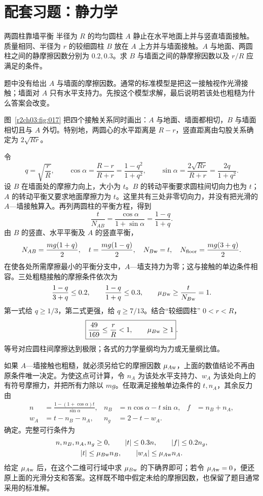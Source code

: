 \section{配套习题：静力学}

\begin{practicebox}{两圆柱靠墙平衡}
半径为 $R$ 的均匀圆柱 $A$ 静止在水平地面上并与竖直墙面接触。质量相同、半径为 $r$ 的较细圆柱 $B$ 放在 $A$ 上方并与墙面接触。$A$ 与地面、两圆柱之间的静摩擦因数分别为 $0.2,0.3$。求 $B$ 与墙面之间的静摩擦因数以及 $r/R$ 应满足的条件。
\label{r2ch03:pr:001}
\begin{solution}
题中没有给出 $A$ 与墙面的摩擦因数。通常的标准模型是把这一接触视作光滑接触；墙面对 $A$ 只有水平支持力。先按这个模型求解，最后说明若该处也粗糙为什么答案会改变。

图~\ref{r2ch03:fig:017} 把四个接触关系同时画出：$A$ 与地面、墙面都相切，$B$ 与墙面相切且与 $A$ 外切。特别地，两圆心的水平距离是 $R-r$，竖直距离由勾股关系确定为 $2\sqrt{Rr}$。
\figTwoCylindersWall

令
\[
 q=\sqrt{\frac rR},\qquad
 \cos\alpha=\frac{R-r}{R+r}=\frac{1-q^2}{1+q^2},\qquad
 \sin\alpha=\frac{2\sqrt{Rr}}{R+r}=\frac{2q}{1+q^2}.
\]
设 $B$ 在墙面处的摩擦力向上，大小为 $t$。$B$ 的转动平衡要求圆柱间切向力也为 $t$；$A$ 的转动平衡又要求地面摩擦力为 $t$。这里共有三处非零切向力，并没有把光滑的 $A$—墙接触算入。再列两圆柱的平衡方程，得到
\[
 \frac{t}{N_{AB}}=\frac{\cos\alpha}{1+\sin\alpha}
 =\frac{1-q}{1+q}.
\]
由 $B$ 的竖直、水平平衡及 $A$ 的竖直平衡，
\[
 N_{AB}=\frac{mg(1+q)}2,\quad
 t=\frac{mg(1-q)}2,\quad
 N_{B{\rm w}}=t,\quad
 N_{\rm floor}=\frac{mg(3+q)}2.
\]
在使各处所需摩擦最小的平衡分支中，$A$—墙支持力为零；这与接触的单边条件相容。三处粗糙接触的摩擦条件依次为
\[
 \frac{1-q}{3+q}\le0.2,\qquad
 \frac{1-q}{1+q}\le0.3,\qquad
 \mu_{B{\rm w}}\ge\frac{t}{N_{B{\rm w}}}=1.
\]
第一式给 $q\ge1/3$，第二式更强，给 $q\ge7/13$。结合“较细圆柱” $0<r<R$，
\[
 \boxed{\frac{49}{169}\le\frac rR<1,\qquad \mu_{B{\rm w}}\ge1}.
\]
等号对应圆柱间摩擦达到极限；各式的力学量纲均为力或无量纲比值。

如果 $A$—墙接触也粗糙，就必须另给它的摩擦因数 $\mu_{A{\rm w}}$，上面的数值结论不再由原条件唯一决定。为使这点可计算，令 $n_A$ 为该处水平支持力、$w_A$ 为该处向上的有符号摩擦力，并把所有力除以 $mg$。任取满足接触单边条件的 $t,n_A$，其余反力由
\[
 \begin{aligned}
 n&=\frac{1-(1+\cos\alpha)t}{\sin\alpha},&
 n_B&=n\cos\alpha-t\sin\alpha,& f&=n_B+n_A,\\
 w_A&=t-n_B-n_A,& n_g&=2-t-w_A.&&
 \end{aligned}
\]
确定。完整可行条件为
\[
 \begin{gathered}
 n,n_B,n_A,n_g\ge0,\qquad |t|\le0.3n,\qquad |f|\le0.2n_g,\\
 |t|\le\mu_{B{\rm w}}n_B,\qquad |w_A|\le\mu_{A{\rm w}}n_A .
 \end{gathered}
\]
给定 $\mu_{A{\rm w}}$ 后，在这个二维可行域中求 $\mu_{B{\rm w}}$ 的下确界即可；若令 $\mu_{A{\rm w}}=0$，便还原上面的光滑分支和答案。这样既不暗中假定未给的摩擦因数，也保留了题目通常采用的标准解。
\end{solution}
\end{practicebox}

